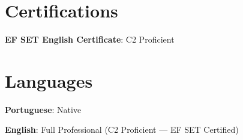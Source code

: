 \documentclass[letterpaper,11pt]{article}
\begin{document}
\section{Certifications}
\begin{itemize}[leftmargin=*, label={}]
  \small{
    \item \textbf{EF SET English Certificate}{: C2 Proficient}
  }
\end{itemize}

\section{Languages}
\begin{itemize}[leftmargin=*, label={}]
  \small{
    \item \textbf{Portuguese}{: Native}
    \item \textbf{English}{: Full Professional (C2 Proficient — EF SET Certified)}
  }
\end{itemize}
\end{document}
